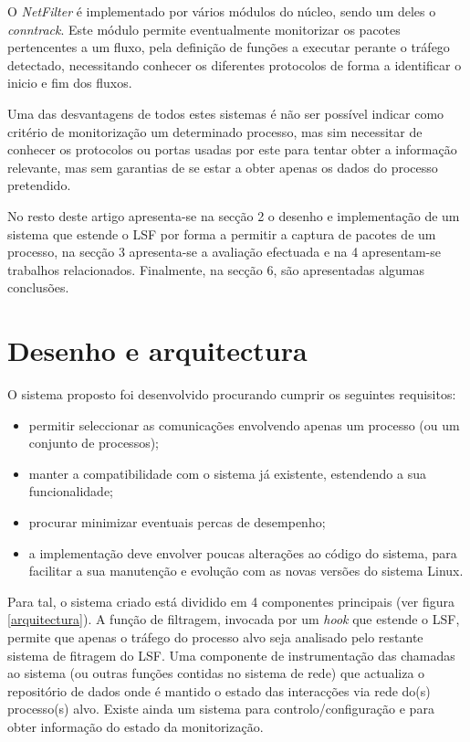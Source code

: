 \documentclass[a4paper]{llncs}
\begin{document}
O \textit{NetFilter} é implementado por vários módulos do núcleo, sendo um deles o \textit{conntrack}\cite{CTS}. Este módulo permite eventualmente monitorizar os pacotes pertencentes a um fluxo, pela definição de funções a executar perante o tráfego detectado, necessitando conhecer os diferentes protocolos de forma a identificar o  inicio e fim dos fluxos. 


Uma das desvantagens de todos estes sistemas é não ser possível indicar como critério de monitorização um determinado processo, mas sim necessitar de conhecer os protocolos ou portas usadas por este para tentar obter a informação relevante, mas sem garantias de se estar a obter apenas os dados do processo pretendido.

No resto deste artigo apresenta-se na secção 2 o desenho e implementação de um sistema que estende o LSF por forma a permitir a captura de pacotes de um processo, na secção 3 apresenta-se a avaliação efectuada e na 4 apresentam-se trabalhos relacionados. Finalmente, na secção 6, são apresentadas algumas conclusões.

\section{Desenho e arquitectura}
\label{sec:architecture}

O sistema proposto foi desenvolvido procurando cumprir os seguintes requisitos:
\begin{itemize}
\item permitir seleccionar as comunicações envolvendo apenas um processo (ou um conjunto de processos);
\item manter a compatibilidade com o sistema já existente, estendendo a sua funcionalidade;
\item procurar minimizar eventuais percas de desempenho;
\item a implementação deve envolver poucas alterações ao código do sistema, para facilitar a sua manutenção e evolução com as novas versões do sistema Linux.
\end{itemize}

Para tal, o sistema criado está dividido em 4 componentes principais (ver figura \ref{arquitectura}). A função de filtragem, invocada por um \textit{hook} que estende o LSF, permite que apenas o tráfego do processo alvo seja analisado pelo restante sistema de fitragem do LSF. Uma componente de instrumentação das chamadas ao sistema (ou outras funções contidas no sistema de rede) que actualiza o repositório de dados onde é mantido o estado das interacções via rede do(s) processo(s) alvo. Existe ainda um sistema para controlo/configuração e para obter informação do estado da monitorização.
\end{document}
